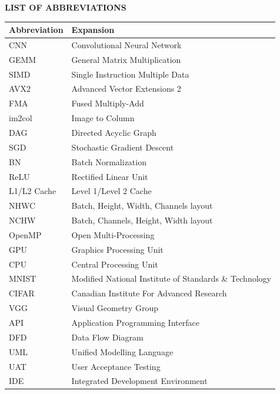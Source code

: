 \documentclass[12pt,oneside,a4paper]{report}
\begin{document}
\listoffigures

\newpage

\listoftables

\newpage

\begin{center}
    \textbf{\large LIST OF ABBREVIATIONS}
\end{center}

\vspace{1.5cm}

\begin{table}[H]
\centering
\begin{tabular}{|l|l|}
\hline
\textbf{Abbreviation} & \textbf{Expansion} \\
\hline
CNN & Convolutional Neural Network \\
\hline
GEMM & General Matrix Multiplication \\
\hline
SIMD & Single Instruction Multiple Data \\
\hline
AVX2 & Advanced Vector Extensions 2 \\
\hline
FMA & Fused Multiply-Add \\
\hline
im2col & Image to Column \\
\hline
DAG & Directed Acyclic Graph \\
\hline
SGD & Stochastic Gradient Descent \\
\hline
BN & Batch Normalization \\
\hline
ReLU & Rectified Linear Unit \\
\hline
L1/L2 Cache & Level 1/Level 2 Cache \\
\hline
NHWC & Batch, Height, Width, Channels layout \\
\hline
NCHW & Batch, Channels, Height, Width layout \\
\hline
OpenMP & Open Multi-Processing \\
\hline
GPU & Graphics Processing Unit \\
\hline
CPU & Central Processing Unit \\
\hline
MNIST & Modified National Institute of Standards \& Technology \\
\hline
CIFAR & Canadian Institute For Advanced Research \\
\hline
VGG & Visual Geometry Group \\
\hline
API & Application Programming Interface \\
\hline
DFD & Data Flow Diagram \\
\hline
UML & Unified Modelling Language \\
\hline
UAT & User Acceptance Testing \\
\hline
IDE & Integrated Development Environment \\
\hline
\end{tabular}
\end{table}
\end{document}
